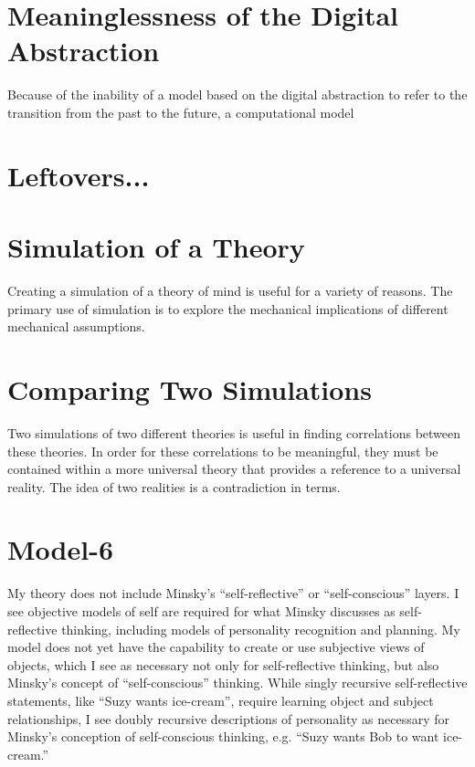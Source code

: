 \section{Meaninglessness of the Digital Abstraction}



Because of the inability of a model based on the digital abstraction
to refer to the transition from the past to the future, a
computational model

\section{Leftovers...}

\section{Simulation of a Theory}

Creating a simulation of a theory of mind is useful for a variety of
reasons.  The primary use of simulation is to explore the mechanical
implications of different mechanical assumptions.

\section{Comparing Two Simulations}

Two simulations of two different theories is useful in finding
correlations between these theories.  In order for these correlations
to be meaningful, they must be contained within a more universal
theory that provides a reference to a universal reality.  The idea of
two realities is a contradiction in terms.


\section{Model-6}

My theory does not include Minsky's ``self-reflective'' or
``self-conscious'' layers.  I see objective models of self are
required for what Minsky discusses as self-reflective thinking,
including models of personality recognition and planning.  My model
does not yet have the capability to create or use subjective views of
objects, which I see as necessary not only for self-reflective
thinking, but also Minsky's concept of ``self-conscious'' thinking.
While singly recursive self-reflective statements, like ``Suzy wants
ice-cream'', require learning object and subject relationships, I see
doubly recursive descriptions of personality as necessary for Minsky's
conception of self-conscious thinking, e.g. ``Suzy wants Bob to want
ice-cream.''

